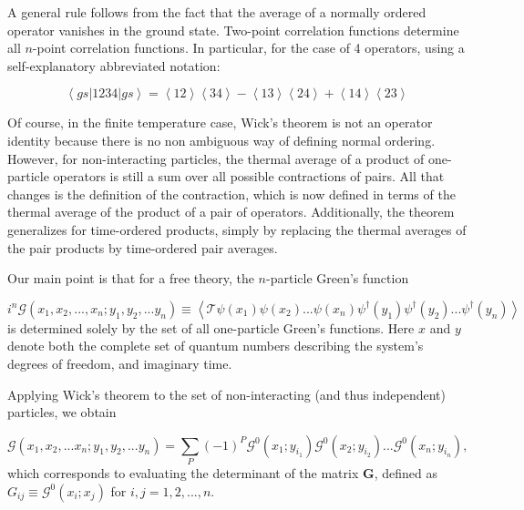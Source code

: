 A general rule follows from the fact that the average of a normally ordered operator vanishes in the ground state.
Two-point correlation functions determine all $n$-point correlation functions.
In particular, for the case of 4 operators, using a self-explanatory abbreviated notation:

\begin{equation}
\left\langle gs | 1234 | gs \right\rangle = \left\langle 12 \right\rangle \left\langle 34 \right\rangle - \left\langle 13 \right\rangle \left\langle 24 \right\rangle + \left\langle 14 \right\rangle \left\langle 23 \right\rangle
\end{equation}

Of course, in the finite temperature case, Wick's theorem is not an operator identity because there is no non ambiguous way of defining normal ordering.
However, for non-interacting particles, the thermal average of a product of one-particle operators is still a sum over all possible contractions of pairs.
All that changes is the definition of the contraction, which is now defined in terms of the thermal average of the product of a pair of operators.
Additionally, the theorem generalizes for time-ordered products, simply by replacing the thermal averages of the pair products by time-ordered pair averages.

Our main point is that for a free theory, the $n$-particle Green's function

\begin{equation}
i^n \mathcal{G} ( x_1, x_2, ..., x_n; y_1, y_2, ... y_n ) \equiv \left\langle \mathcal{T} \psi ( x_1 ) \psi ( x_2 ) ... \psi ( x_n ) \psi^\dagger ( y_1 ) \psi^\dagger ( y_2 ) ... \psi^\dagger ( y_n ) \right\rangle
\end{equation}
is determined solely by the set of all one-particle Green's functions.
Here $x$ and $y$ denote both the complete set of quantum numbers describing the system's degrees of freedom, and imaginary time.

Applying Wick's theorem to the set of non-interacting (and thus independent) particles, we obtain

\begin{equation}
\mathcal{G} ( x_1, x_2, ... x_n; y_1, y_2,... y_n ) = \sum_P (- 1 )^P \mathcal{G}^0 ( x_1; y_{i_1} ) \mathcal{G}^0 ( x_2; y_{i_2} ) ... \mathcal{G}^0 ( x_n; y_{i_n} ) ,
\end{equation}
which corresponds to evaluating the determinant of the matrix $\bm G$, defined as $G_{ij} \equiv \mathcal{G}^0 ( x_i ; x_j )$ for $i, j = 1, 2, ..., n$.